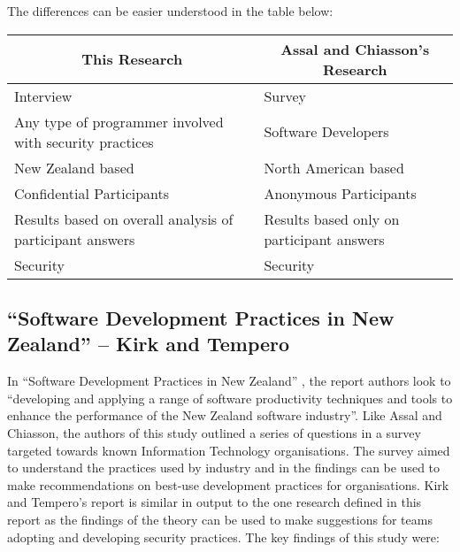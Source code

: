 The differences can be easier understood in the table below:
\newline
\begin{table}[htb]
\begin{tabular}{|l|l|}
\hline
\multicolumn{1}{|c|}{\textbf{This Research}}              & \multicolumn{1}{c|}{\textbf{Assal and Chiasson's Research}} \\ \hline
Interview                 & Survey                 \\ \hline
Any type of programmer involved with security practices  & Software Developers                                        \\ \hline
New Zealand based         & North American based   \\ \hline
Confidential Participants & Anonymous Participants \\ \hline
Results based on overall analysis of participant answers & Results based only on participant answers                  \\ \hline
Security                  & Security \\ \hline
\end{tabular}
\end{table}


\newpage
\subsection{“Software Development Practices in New Zealand” – Kirk and Tempero}

\par In “Software Development Practices in New Zealand” \cite{summary2}, the report authors look to “developing and applying a range of software productivity techniques and tools to enhance the performance of the New Zealand software industry”. Like Assal and Chiasson, the authors of this study outlined a series of questions in a survey targeted towards known Information Technology organisations. The survey aimed to understand the practices used by industry and in the findings can be used to make recommendations on best-use development practices for organisations. Kirk and Tempero’s report is similar in output to the one research defined in this report as the findings of the theory can be used to make suggestions for teams adopting and developing security practices. 
\newline
\newline
The key findings of this study were:

